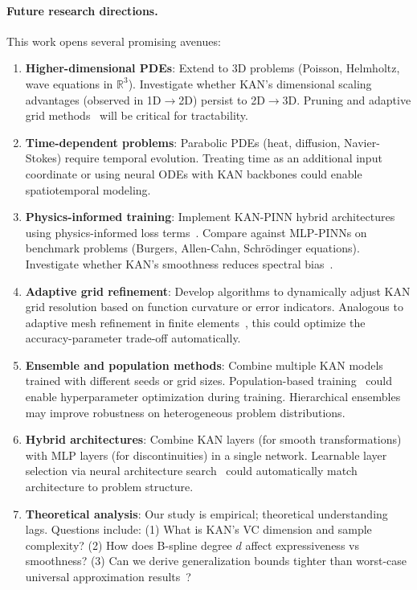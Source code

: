 \documentclass[11pt,a4paper]{article}
\begin{document}
\paragraph{Future research directions.} This work opens several promising avenues:
\begin{enumerate}
    \item \textbf{Higher-dimensional PDEs}: Extend to 3D problems (Poisson, Helmholtz, wave equations in $\mathbb{R}^3$). Investigate whether KAN's dimensional scaling advantages (observed in 1D$\to$2D) persist to 2D$\to$3D. Pruning and adaptive grid methods~\citep{huang2011adaptive} will be critical for tractability.
    \item \textbf{Time-dependent problems}: Parabolic PDEs (heat, diffusion, Navier-Stokes) require temporal evolution. Treating time as an additional input coordinate or using neural ODEs with KAN backbones could enable spatiotemporal modeling.
    \item \textbf{Physics-informed training}: Implement KAN-PINN hybrid architectures using physics-informed loss terms~\citep{raissi2019physics}. Compare against MLP-PINNs on benchmark problems (Burgers, Allen-Cahn, Schrödinger equations). Investigate whether KAN's smoothness reduces spectral bias~\citep{krishnapriyan2021characterizing}.
    \item \textbf{Adaptive grid refinement}: Develop algorithms to dynamically adjust KAN grid resolution based on function curvature or error indicators. Analogous to adaptive mesh refinement in finite elements~\citep{huang2011adaptive}, this could optimize the accuracy-parameter trade-off automatically.
    \item \textbf{Ensemble and population methods}: Combine multiple KAN models trained with different seeds or grid sizes. Population-based training~\citep{jaderberg2017population} could enable hyperparameter optimization during training. Hierarchical ensembles~\citep{dietterich2000ensemble} may improve robustness on heterogeneous problem distributions.
    \item \textbf{Hybrid architectures}: Combine KAN layers (for smooth transformations) with MLP layers (for discontinuities) in a single network. Learnable layer selection via neural architecture search~\citep{zoph2017neural, liu2019darts} could automatically match architecture to problem structure.
    \item \textbf{Theoretical analysis}: Our study is empirical; theoretical understanding lags. Questions include: (1) What is KAN's VC dimension and sample complexity? (2) How does B-spline degree $d$ affect expressiveness vs smoothness? (3) Can we derive generalization bounds tighter than worst-case universal approximation results~\citep{liu2024kan}?
\end{enumerate}
\end{document}
